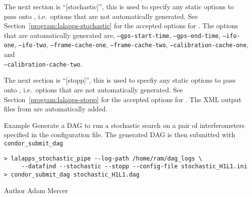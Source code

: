 \begin{entry}
The next section is ``[stochastic]'', this is used to specify any static
options to pass onto , i.e.~options that are
not automatically generated. See
Section~\ref{program:lalapps-stochastic} for the accepted options for
. The options that are automatically generated
are, \texttt{--gps-start-time}, \texttt{--gps-end-time},
\texttt{--ifo-one}, \texttt{--ifo-two}, \texttt{--frame-cache-one},
\texttt{--frame-cache-two}, \texttt{--calibration-cache-one}, and\\
\texttt{--calibration-cache-two}.

The next section is ``[stopp]'', this is used to specfiy any static
options to pass onto , i.e.~options that are not
automatically generated. See Section~\ref{program:lalapps-stopp} for the
accepted options for . The XML output files from
 are automatically added.

\item[Example]
Generate a DAG to run a stochastic search on a pair of interferometers
specified in the configuration file. The generated DAG is then submitted
with \texttt{condor\_submit\_dag}

\begin{verbatim}
> lalapps_stochastic_pipe --log-path /home/ram/dag_logs \
     --datafind --stochastic --stopp --config-file stochastic_H1L1.ini
> condor_submit_dag stochastic_H1L1.dag
\end{verbatim}

\item[Author]
Adam Mercer
\end{entry}
